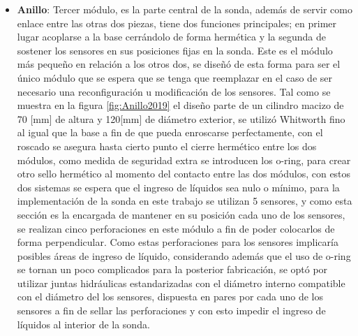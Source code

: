 \begin{itemize}
    \item \textbf{Anillo}: Tercer
    m\'odulo, es la parte central de la sonda, adem\'as de servir como enlace 
    entre las otras dos piezas, tiene dos funciones principales; en primer lugar acoplarse a la base cerr\'andolo de forma herm\'etica y la segunda de sostener los sensores en sus posiciones fijas en la sonda. Este es el m\'odulo m\'as peque\~no en relaci\'on a los otros dos, se diseñó de esta forma para ser el \'unico m\'odulo que se espera que se tenga que reemplazar en el caso de ser necesario una reconfiguraci\'on u modificaci\'on de los sensores. Tal como se muestra en la figura \ref{fig:Anillo2019} el dise\~no parte de un cilindro macizo de 70 [mm] de altura y 120[mm] de di\'ametro exterior, se utiliz\'o Whitworth fino al igual que la base a fin de que pueda enroscarse  perfectamente, con el roscado se asegura hasta cierto punto el cierre herm\'etico entre los dos m\'odulos, como medida de seguridad extra se introducen los o-ring, para crear otro  sello hermético al momento del contacto entre las dos m\'odulos, con estos dos sistemas se espera que el ingreso de l\'iquidos sea nulo o m\'inimo, para la implementaci\'on de la sonda en este trabajo se utilizan 5 sensores, y como esta secci\'on es la encargada de mantener en su posici\'on cada uno de los sensores, se realizan cinco perforaciones en este m\'odulo a fin de poder colocarlos de forma perpendicular. Como estas perforaciones para los sensores implicar\'ia posibles \'areas de ingreso de l\'iquido, considerando adem\'as que el uso de o-ring se tornan un poco complicados para la posterior fabricaci\'on, se opt\'o por utilizar juntas hidr\'aulicas estandarizadas con el di\'ametro interno compatible con el di\'ametro del los sensores, dispuesta en pares por cada uno de los sensores a fin de sellar las perforaciones y con esto impedir el ingreso de líquidos al interior de la sonda.
    

\end{itemize}
